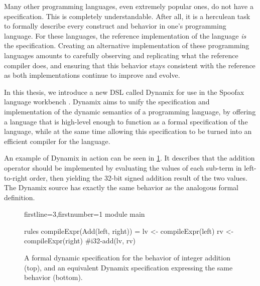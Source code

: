 Many other programming languages, even extremely popular ones, do not have a specification. This is completely understandable. After all, it is a herculean task to formally describe every construct and behavior in one's programming language. For these languages, the reference implementation of the language \textit{is} the specification. Creating an alternative implementation of these programming languages amounts to carefully observing and replicating what the reference compiler does, and ensuring that this behavior stays consistent with the reference as both implementations continue to improve and evolve.\\



In this thesis, we introduce a new \ac{DSL} called Dynamix for use in the Spoofax language workbench \cite{Spoofax2021}. Dynamix aims to unify the specification and implementation of the dynamic semantics of a programming language, by offering a language that is high-level enough to function as a formal specification of the language, while at the same time allowing this specification to be turned into an efficient compiler for the language.

An example of Dynamix in action can be seen in \cref{fig:dynamix_addition}. It describes that the addition operator should be implemented by evaluating the values of each sub-term in left-to-right order, then yielding the 32-bit signed addition result of the two values. The Dynamix source has exactly the same behavior as the analogous formal definition.

\begin{figure}
  \begin{prooftree}
  \end{prooftree}
  \begin{dynamix*}{firstline=3,firstnumber=1}
module main

rules
  compileExpr(Add(left, right)) = {
    lv <- compileExpr(left)
    rv <- compileExpr(right)
    #i32-add(lv, rv)
  }
  \end{dynamix*}
  \caption{A formal dynamic specification for the behavior of integer addition (top), and an equivalent Dynamix specification expressing the same behavior (bottom).}
  \label{fig:dynamix_addition}
\end{figure}

